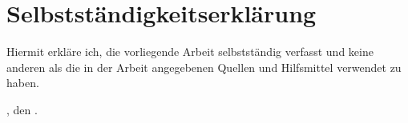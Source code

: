\chapter*{Selbstständigkeitserklärung}
\thispagestyle{empty}

\noindent Hiermit erkläre ich, die vorliegende Arbeit selbstständig verfasst und keine anderen als die in der Arbeit angegebenen Quellen und Hilfsmittel verwendet zu haben. 

\vspace*{1cm}

\noindent \getPrintLocationDE, den \getSubmissionDateDE.

\vspace*{2cm}
\par\noindent\makebox[2.5in]{\hspace*{-1pt}\dotfill}
\par\noindent\makebox[2.5in][l]{\getAuthor}
